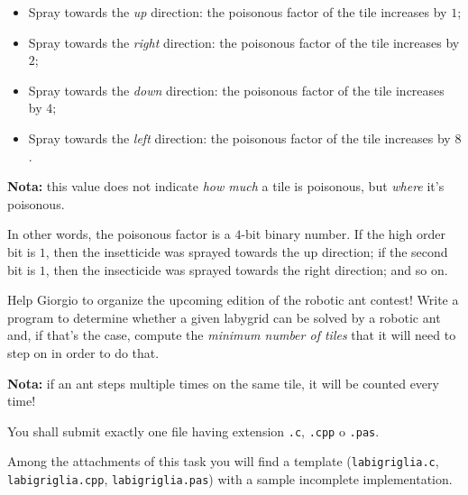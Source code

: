 \begin{itemize} %
  \item Spray towards the \emph{up} direction: the poisonous factor of the tile increases by $1$;
  \item Spray towards the \emph{right} direction: the poisonous factor of the tile increases by $2$;
  \item Spray towards the \emph{down} direction: the poisonous factor of the tile increases by $4$;
  \item Spray towards the \emph{left} direction: the poisonous factor of the tile increases by $8$.
\end{itemize}

\textbf{Nota:} this value does not indicate \emph{how much} a tile is poisonous, but \emph{where} it's poisonous.

\begin{warning}
  In other words, the poisonous factor is a $4$-bit binary number. If the high order bit is $1$, then the insetticide was sprayed towards the up direction; if the second bit is $1$, then the insecticide was sprayed towards the right direction; and so on.
\end{warning}

Help Giorgio to organize the upcoming edition of the robotic ant contest! Write a program to determine whether a given labygrid can be solved by a robotic ant and, if that's the case, compute the \emph{minimum number of tiles} that it will need to step on in order to do that.

\textbf{Nota:} if an ant steps multiple times on the same tile, it will be counted every time!

\Implementation
You shall submit exactly one file having extension \texttt{.c}, \texttt{.cpp} o \texttt{.pas}.

\begin{warning}
Among the attachments of this task you will find a template (\texttt{labigriglia.c}, \texttt{labigriglia.cpp}, \texttt{labigriglia.pas}) with a sample incomplete implementation.
\end{warning}

